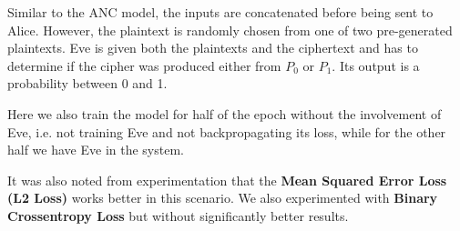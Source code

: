 \documentclass[a4paper]{article}
\begin{document}
      Similar to the ANC model, the inputs are concatenated before being sent to Alice.
      However, the plaintext is randomly chosen from one of two pre-generated plaintexts.
      Eve is given both the plaintexts and the ciphertext and has to determine if the cipher
      was produced either from $P_{0}$ or $P_{1}$. Its output is a probability between 0 and 1.

      Here we also train the model for half of the epoch without the involvement of Eve, i.e. not 
      training Eve and not backpropagating its loss, while for the other half we have Eve in the system.

      It was also noted from experimentation that the {\bfseries Mean Squared Error Loss (L2 Loss)} works better in this
      scenario. We also experimented with {\bfseries Binary Crossentropy Loss} but without significantly better results.
\end{document}
